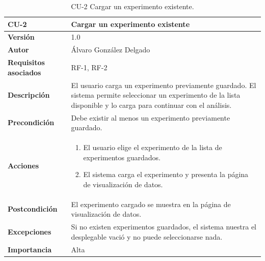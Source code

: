 \FloatBarrier

\begin{table}[p]
	\centering
	\begin{tabularx}{\linewidth}{ p{} p{} }
		\toprule
		\textbf{CU-2}    & \textbf{Cargar un experimento existente} \\
		\toprule
		\textbf{Versión}              & 1.0    \\
		\textbf{Autor}                & Álvaro González Delgado \\
		\textbf{Requisitos asociados} & RF-1, RF-2 \\
		\textbf{Descripción}          & El usuario carga un experimento previamente guardado. El sistema permite seleccionar un experimento de la lista disponible y lo carga para continuar con el análisis. \\
		\textbf{Precondición}         & Debe existir al menos un experimento previamente guardado. \\
		\textbf{Acciones}             &
		\begin{enumerate}
			\item El usuario elige el experimento de la lista de experimentos guardados.
			\item El sistema carga el experimento y presenta la página de visualización de datos.
		\end{enumerate} \\
		\textbf{Postcondición}        & El experimento cargado se muestra en la página de visualización de datos. \\
		\textbf{Excepciones}          & Si no existen experimentos guardados, el sistema nuestra el desplegable vació y no puede seleccionarse nada. \\
		\textbf{Importancia}          & Alta \\
		\bottomrule
	\end{tabularx}
	\caption{CU-2 Cargar un experimento existente.}
\end{table}

\FloatBarrier


